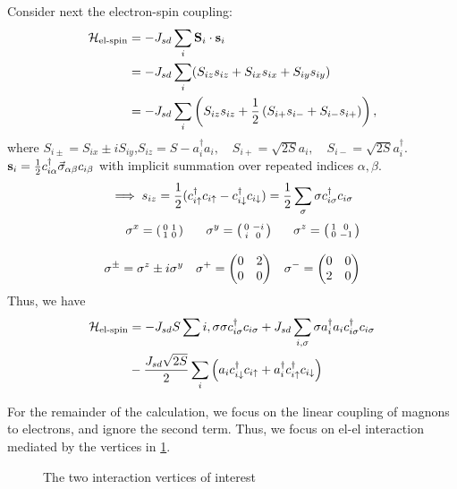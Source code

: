 Consider next the electron-spin coupling: 
\begin{align}
	\mathcal{H}_\text{el-spin} &= -J_{sd}\sum_i\vb S_i\cdot \vb s_i \\
	&=-J_{sd}\sum_i(S_{iz}s_{iz} + S_{ix}s_{ix} + S_{iy}s_{iy}) \\
	&=-J_{sd}\sum_i\left(S_{iz}s_{iz}+ \frac12\left(S_{i+}s_{i-} + S_{i-}s_{i+}\right)\right),
\end{align}
where $S_{i\pm} = S_{ix}\pm iS_{iy}$,\quad \(S_{iz} = S-a_i^\dagger a_i, \quad S_{i+} = \sqrt{2S}a_i, \quad S_{i-} = \sqrt{2S}a_i^\dagger\). $\vb s_i =\frac12c_{i\alpha}^\dagger \vec\sigma_{\alpha\beta}c_{i\beta}$ with implicit summation over repeated indices $\alpha, \beta$. \[\implies s_{iz} = \frac12(c^{\dagger}_{i\uparrow}c_{i\uparrow} - c^{\dagger}_{i\downarrow}c_{i\downarrow}) = \frac12\sum_\sigma\sigma c^{\dagger}_{i\sigma}c_{i\sigma}\]
\begin{align*}
\sigma^x = \smqty(\pmat1) &&\sigma^y = \smqty(\pmat2) &&\sigma^z= \smqty(\pmat3) \\[2ex]
\sigma^\pm = \sigma^z \pm i\sigma^y &&\sigma^+ = \begin{pmatrix}
0 & 2 \\ 0&0
\end{pmatrix}
&&\sigma^- = \begin{pmatrix}
0&0\\2&0
\end{pmatrix}
\end{align*}
Thus, we have
\begin{align}
\begin{split}
	\mathcal{H}_\text{el-spin} &= -J_{sd}S\sum{i,\sigma}\sigma c^{\dagger}_{i\sigma}c_{i\sigma}+J_{sd}\sum_{i,\sigma}\sigma a_i^\dagger a_i c^{\dagger}_{i\sigma}c_{i\sigma} \\ 
	&-\frac{J_{sd}\sqrt{2S}}{2}\sum_i\left(a_ic^{\dagger}_{i\downarrow}c_{i\uparrow} + a^{\dagger}_i c^{\dagger}_{i\uparrow}c_{i\downarrow}\right)
\end{split}
\end{align}

For the remainder of the calculation, we focus on the linear coupling of magnons to electrons, and ignore the second term. Thus, we focus on el-el interaction mediated by the vertices in \cref{fig:el-magnon-vertices}.

\begin{figure}
	\centering
	\begin{subfigure}{0.49\linewidth}
		\centering
		
	\end{subfigure}
	\begin{subfigure}{0.49\linewidth}
		\centering
		
	\end{subfigure}
	\caption{The two interaction vertices of interest}
	\label{fig:el-magnon-vertices}
\end{figure}

